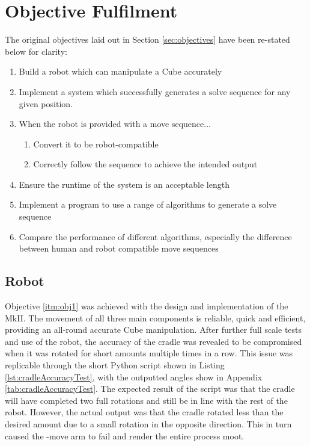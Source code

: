 \documentclass{report}
\newcommand{\move}[1]{\uppercase{\texttt{\formatmovesnospace{#1}}}-move}
\begin{document}
    \section{Objective Fulfilment}
    
    The original objectives laid out in Section \ref{sec:objectives} have been re-stated below for clarity:
    
    \begin{enumerate}
    	\item Build a robot which can manipulate a Cube accurately \label{itm:obj1}
    	\item Implement a system which successfully generates a solve sequence for any given position. \label{itm:obj2}
    	\item When the robot is provided with a move sequence... \label{itm:obj3}
    	\begin{enumerate}
    		\item Convert it to be robot-compatible \label{itm:obj3a}
    		\item Correctly follow the sequence to achieve the intended output \label{itm:obj3b}
    	\end{enumerate}
    	\item Ensure the runtime of the system is an acceptable length \label{itm:obj4}
    	\item Implement a program to use a range of algorithms to generate a solve sequence \label{itm:obj5}
    	\item Compare the performance of different algorithms, especially the difference between human and robot compatible move sequences \label{itm:obj6}
    \end{enumerate}
    
    \subsection{Robot}
    
    Objective \ref{itm:obj1} was achieved with the design and implementation of the MkII. The movement of all three main components is reliable, quick and efficient, providing an all-round accurate Cube manipulation. After further full scale tests and use of the robot, the accuracy of the cradle was revealed to be compromised when it was rotated for short amounts multiple times in a row. This issue was replicable through the short Python script shown in Listing \ref{lst:cradleAccuracyTest}, with the outputted angles show in Appendix \ref{tab:cradleAccuracyTest}. The expected result of the script was that the cradle will have completed two full rotations and still be in line with the rest of the robot. However, the actual output was that the cradle rotated less than the desired amount due to a small rotation in the opposite direction. This in turn caused the \move{x} arm to fail and render the entire process moot.
\end{document}
